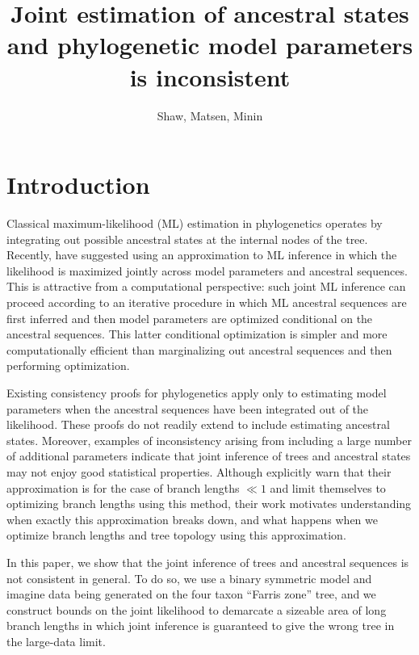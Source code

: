 \documentclass{article}
\title{Joint estimation of ancestral states and phylogenetic model parameters is inconsistent}
\author{Shaw, Matsen, Minin}
\begin{document}
\maketitle

\renewcommand{\arraystretch}{1.2} %


\section*{Introduction}

Classical maximum-likelihood (ML) estimation in phylogenetics operates by integrating out possible ancestral states at the internal nodes of the tree.
Recently, \cite{Sagulenko2017-jo} have suggested using an approximation to ML inference in which the likelihood is maximized jointly across model parameters and ancestral sequences.
This is attractive from a computational perspective: such joint ML inference can proceed according to an iterative procedure in which ML ancestral sequences are first inferred and then model parameters are optimized conditional on the ancestral sequences.
This latter conditional optimization is simpler and more computationally efficient than marginalizing out ancestral sequences and then performing optimization.

Existing consistency proofs for phylogenetics \cite{RoyChoudhury2015-ta} apply only to estimating model parameters when the ancestral sequences have been integrated out of the likelihood.
These proofs do not readily extend to include estimating ancestral states.
Moreover, examples of inconsistency arising from including a large number of additional parameters \cite{Neyman1948-tt} indicate that joint inference of trees and ancestral states may not enjoy good statistical properties.
Although \cite{Sagulenko2017-jo} explicitly warn that their approximation is for the case of branch lengths $\ll 1$ and limit themselves to optimizing branch lengths using this method, their work motivates understanding when exactly this approximation breaks down, and what happens when we optimize branch lengths and tree topology using this approximation.

In this paper, we show that the joint inference of trees and ancestral sequences is not consistent in general.
To do so, we use a binary symmetric model and imagine data being generated on the four taxon ``Farris zone'' \cite{Siddall1998-hq} tree, and we construct bounds on the joint likelihood to demarcate a sizeable area of long branch lengths in which joint inference is guaranteed to give the wrong tree in the large-data limit.
\end{document}

